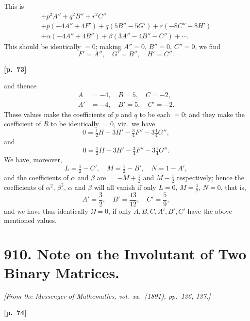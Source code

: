 \documentclass[11pt,a4paper]{article}
\theoremstyle{plain}
\begin{document}
This is
\begin{multline*}
+ p^2 A'' + q^2 B'' + r^2 C'' \\
+ p(-4A'' + 4F') + q(5B'' - 5G') + r(-8C'' + 8H') \\
+ \alpha(-4A'' + 4B'') + \beta(3A'' - 4B'' - C'') + \cdots.
\end{multline*}
This should be identically $= 0$; making $A'' = 0$, $B'' = 0$, $C'' = 0$, we find
$$
F' = A'', \quad G' = B'', \quad H' = C''.
$$

\vspace{0.5em}
\noindent\textbf{[p.\ 73]}

and thence
\begin{align*}
A &= -4, \quad B = 5, \quad C = -2, \\
A' &= -4, \quad B' = 5, \quad C' = -2.
\end{align*}
These values make the coefficients of $p$ and $q$ to be each $= 0$; and they make the coefficient of $R$ to be identically $= 0$, viz.\ we have
$$
0 = \tfrac{1}{2}H - 3H' - \tfrac{3}{4}F'' - 3\tfrac{1}{4}G'',
$$
and
$$
0 = \tfrac{1}{2}II - 3H' - \tfrac{3}{4}F'' - 3\tfrac{1}{4}G''.
$$
We have, moreover,
$$
L = \tfrac{1}{2} - C', \quad M = \tfrac{1}{2} - B', \quad N = 1 - A',
$$
and the coefficients of $\alpha$ and $\beta$ are $= -M + \frac{1}{2}$ and $M - \frac{1}{2}$ respectively; hence the coefficients of $\alpha^2$, $\beta^2$, $\alpha$ and $\beta$ will all vanish if only $L = 0$, $M = \frac{1}{2}$, $N = 0$, that is,
$$
A' = \frac{3}{2}, \quad B' = \frac{13}{12}, \quad C' = \frac{5}{9},
$$
and we have thus identically $\Omega = 0$, if only $A, B, C, A', B', C'$ have the above-mentioned values.

\newpage

\section*{910. Note on the Involutant of Two Binary Matrices.}

\noindent\textit{[From the Messenger of Mathematics, vol.\ xx.\ (1891), pp.\ 136, 137.]}

\vspace{0.5em}
\noindent\textbf{[p.\ 74]}
\end{document}
